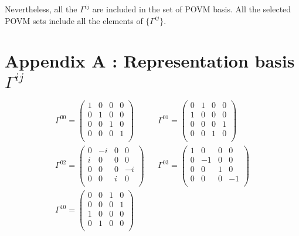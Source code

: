 Nevertheless, all the $\Gamma^{ij}$ are included in the set of POVM basis. 
All the selected POVM  sets include all the elements of $\{\Gamma^{ij}\}$.

\newpage
\section*{Appendix A : Representation basis $\Gamma^{ij}$}
\label{section:Gamma}
\begin{align*}
    \Gamma^{00} = 
    \begin{pmatrix}
    1  &  0  &  0  &  0  \\
    0  &  1  &  0  &  0  \\
    0  &  0  &  1  &  0  \\
    0  &  0  &  0  &  1  \\
    \end{pmatrix}
    &&
    \Gamma^{01} = 
    \begin{pmatrix}
    0  &  1  &  0  &  0  \\
    1  &  0  &  0  &  0  \\
    0  &  0  &  0  &  1  \\
    0  &  0  &  1  &  0  \\
    \end{pmatrix}
    \\
    \Gamma^{02} = 
    \begin{pmatrix}
    0  &  -i  &  0  &  0  \\
    i  &  0  &  0  &  0  \\
    0  &  0  &  0  &  -i  \\
    0  &  0  &  i  &  0  \\
    \end{pmatrix}
    &&
    \Gamma^{03} = 
    \begin{pmatrix}
    1  &  0  &  0  &  0  \\
    0  &  -1  &  0  &  0  \\
    0  &  0  &  1  &  0  \\
    0  &  0  &  0  &  -1  \\
    \end{pmatrix}
    \\
    \Gamma^{10} = 
    \begin{pmatrix}
    0  &  0  &  1  &  0  \\
    0  &  0  &  0  &  1  \\
    1  &  0  &  0  &  0  \\
    0  &  1  &  0  &  0  \\
    \end{pmatrix}

\end{align*}
